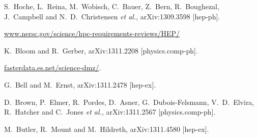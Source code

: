 \begin{thebibliography}{99}
  S.~Hoche, L.~Reina, M.~Wobisch, C.~Bauer, Z.~Bern, R.~Boughezal, J.~Campbell and N.~D.~Christensen {\it et al.},
  arXiv:1309.3598 [hep-ph].

\url{www.nersc.gov/science/hpc-requirements-reviews/HEP/}

  K.~Bloom and R.~Gerber,
  arXiv:1311.2208 [physics.comp-ph].

\url{fasterdata.es.net/science-dmz/}.

  G.~Bell and M.~Ernst,
  arXiv:1311.2478 [hep-ex].

  D.~Brown, P.~Elmer, R.~Pordes, D.~Asner, G.~Dubois-Felsmann, V.~D.~Elvira, R.~Hatcher and C.~Jones {\it et al.},
  arXiv:1311.2567 [physics.comp-ph].

  M.~Butler, R.~Mount and M.~Hildreth,
  arXiv:1311.4580 [hep-ex].

\end{thebibliography}
